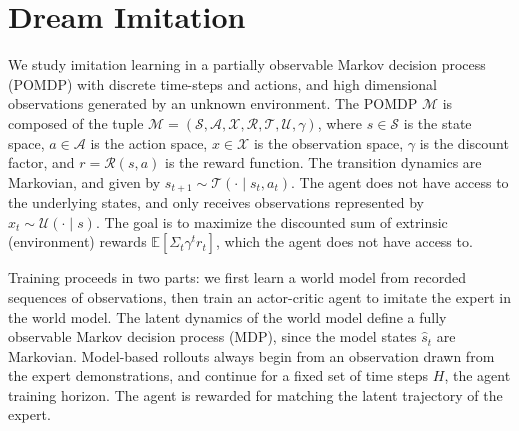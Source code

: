 \documentclass[10pt]{article} %
\theoremstyle{plain}
\theoremstyle{definition}
\theoremstyle{remark}
\begin{document}
\section{Dream Imitation}

We study imitation learning in a partially observable Markov decision process (POMDP) with discrete time-steps and actions, and high dimensional observations generated by an unknown environment. The POMDP $\mathcal{M}$ is composed of the tuple $\mathcal{M} = (\mathcal{S},\mathcal{A},\mathcal{X},\mathcal{R},\mathcal{T},\mathcal{U},\gamma)$, where $s \in \mathcal{S}$ is the state space, $a \in \mathcal{A}$ is the action space, $x \in \mathcal{X}$ is the observation space, $\gamma$ is the discount factor, and $r = \mathcal{R}(s,a)$ is the reward function. The transition dynamics are Markovian, and given by $s_{t+1} \sim \mathcal{T}(\cdot\mid s_t, a_t)$. The agent does not have access to the underlying states, and only receives observations represented by $x_t \sim \mathcal{U}(\cdot\mid s)$. The goal is to maximize the discounted sum of extrinsic (environment) rewards $\mathbb{E}[\Sigma_{t}\gamma^t r_t]$, which the agent does not have access to.

Training proceeds in two parts: we first learn a world model from recorded sequences of observations, then train an actor-critic agent to imitate the expert in the world model. The latent dynamics of the world model define a fully observable Markov decision process (MDP), since the model states $\hat{s}_t$ are Markovian. Model-based rollouts always begin from an observation drawn from the expert demonstrations, and continue for a fixed set of time steps $H$, the agent training horizon. The agent is rewarded for matching the latent trajectory of the expert.
\end{document}
